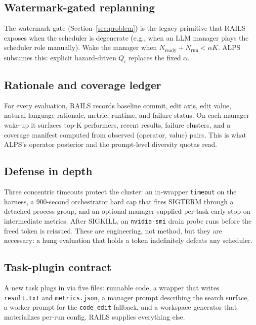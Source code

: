 \documentclass{article}
\newcommand{\alps}{ALPS\xspace}
\newcommand{\rails}{RAILS\xspace}
\begin{document}
\subsection{Watermark-gated replanning}

The watermark gate (Section~\ref{sec:problem}) is the legacy primitive that \rails exposes when the scheduler is degenerate (e.g., when an LLM manager plays the scheduler role manually). Wake the manager when $N_{\mathrm{ready}} + N_{\mathrm{run}} < \alpha K$. \alps subsumes this: explicit hazard-driven $Q_t$ replaces the fixed $\alpha$.

\subsection{Rationale and coverage ledger}

For every evaluation, \rails records baseline commit, edit axis, edit value, natural-language rationale, metric, runtime, and failure status. On each manager wake-up it surfaces top-K performers, recent results, failure clusters, and a coverage manifest computed from observed (operator, value) pairs. This is what \alps's operator posterior and the prompt-level diversity quotas read.

\subsection{Defense in depth}

Three concentric timeouts protect the cluster: an in-wrapper \texttt{timeout} on the harness, a 900-second orchestrator hard cap that fires SIGTERM through a detached process group, and an optional manager-supplied per-task early-stop on intermediate metrics. After SIGKILL, an \texttt{nvidia-smi} drain probe runs before the freed token is reissued. These are engineering, not method, but they are necessary: a hung evaluation that holds a token indefinitely defeats any scheduler.

\subsection{Task-plugin contract}

A new task plugs in via five files: runnable code, a wrapper that writes \texttt{result.txt} and \texttt{metrics.json}, a manager prompt describing the search surface, a worker prompt for the \texttt{code\_edit} fallback, and a workspace generator that materializes per-run config. \rails supplies everything else.
\end{document}

